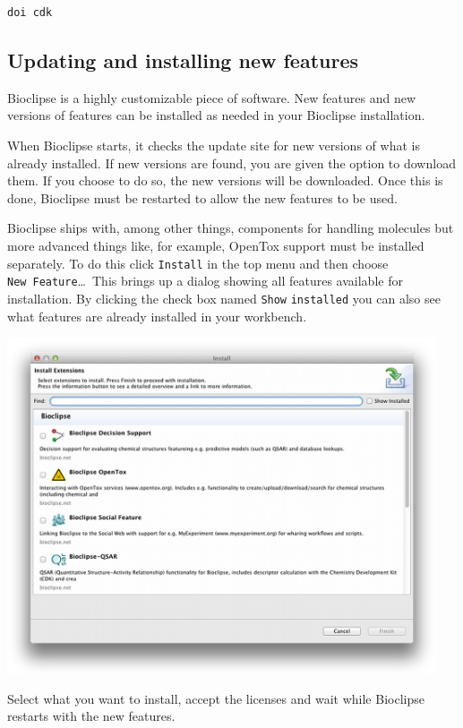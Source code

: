 \documentclass[a5paper, 10pt]{memoir}
\begin{document}
\begin{refsection}
\begin{Verbatim}
doi cdk
\end{Verbatim}

\subsection{Updating and installing new features} 
Bioclipse is a highly customizable piece of software. New features and new
versions of features can be installed as needed in your Bioclipse
installation.

When Bioclipse starts, it checks the update site for new versions of what is
already installed. If new versions are found, you are given the option to
download them. If you choose to do so, the new versions will be downloaded.
Once this is done, Bioclipse must be restarted to allow the new features to be
used.

Bioclipse ships with, among other things, components for handling molecules but
more advanced things like, for example, OpenTox support must be installed
separately. To do this click \texttt{Install} in the top menu and then choose
\texttt{New}~\texttt{Feature}\ldots\ This brings up a dialog showing all
features available for installation. By clicking the check box named
\texttt{Show} \texttt{installed} you can also see what features are already
installed in your workbench.

\begin{center}
\includegraphics[width=0.95\textwidth]{images/installFeatures.png}
\end{center}

Select what you want to install, accept the licenses and wait while Bioclipse
restarts with the new features.


\end{refsection}
\end{document}
